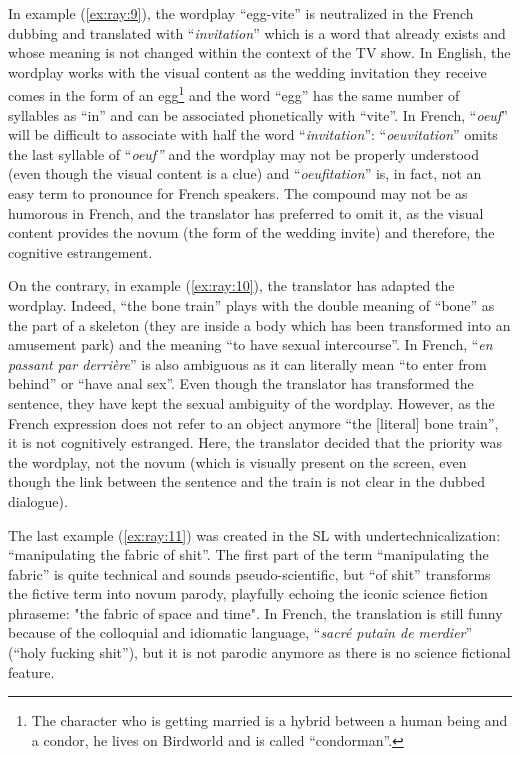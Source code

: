 \documentclass[output=paper]{langscibook}
\begin{document}
In example (\ref{ex:ray:9}), the wordplay “egg-vite” is neutralized in the French dubbing and translated with “\textit{invitation}” which is a word that already exists and whose meaning is not changed within the context of the TV show. In English, the wordplay works with the visual content as the wedding invitation they receive comes in the form of an egg\footnote{The character who is getting married is a hybrid between a human being and a condor, he lives on Birdworld and is called “condorman”.} and the word “egg” has the same number of syllables as “in” and can be associated phonetically with “vite”. In French, “\textit{oeuf}” will be difficult to associate with half the word “\textit{invitation}”: “\textit{oeuvitation}” omits the last syllable of “\textit{oeuf”} and the wordplay may not be properly understood (even though the visual content is a clue) and “\textit{oeufitation}” is, in fact, not an easy term to pronounce for French speakers. The compound may not be as humorous in French, and the translator has preferred to omit it, as the visual content provides the novum (the form of the wedding invite) and therefore, the cognitive estrangement.

On the contrary, in example (\ref{ex:ray:10}), the translator has adapted the wordplay. Indeed, “the bone train” plays with the double meaning of “bone” as the part of a skeleton (they are inside a body which has been transformed into an amusement park) and the meaning “to have sexual intercourse”. In French, “\textit{en passant par derrière}” is also ambiguous as it can literally mean “to enter from behind” or “have anal sex”. Even though the translator has transformed the sentence, they have kept the sexual ambiguity of the wordplay. However, as the French expression does not refer to an object anymore “the [literal] bone train”, it is not cognitively estranged. Here, the translator decided that the priority was the wordplay, not the novum (which is visually present on the screen, even though the link between the sentence and the train is not clear in the dubbed dialogue).

The last example (\ref{ex:ray:11}) was created in the SL with undertechnicalization: “manipulating the fabric of shit”. The first part of the term “manipulating the fabric” is quite technical and sounds pseudo-scientific, but “of shit” transforms the fictive term into novum parody, playfully echoing the iconic science fiction phraseme: "the fabric of space and time". In French, the translation is still funny because of the colloquial and idiomatic language, “\textit{sacré putain de merdier}” (“holy fucking shit”), but it is not parodic anymore as there is no science fictional feature.
\end{document}

